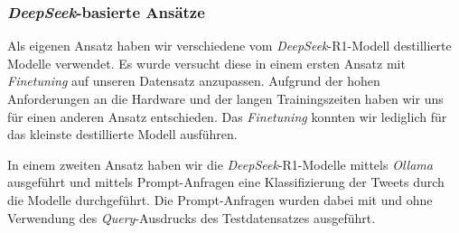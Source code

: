 \subsubsection{\textit{DeepSeek}-basierte Ansätze}\label{subsec:deepseek}

Als eigenen Ansatz haben wir verschiedene vom \textit{DeepSeek}-R1-Modell destillierte Modelle \cite{deepseekai2025deepseekr1incentivizingreasoningcapability} verwendet.
Es wurde versucht diese in einem ersten Ansatz mit \textit{Finetuning} auf unseren Datensatz anzupassen.
Aufgrund der hohen Anforderungen an die Hardware und der langen Trainingszeiten haben wir uns für einen anderen Ansatz entschieden. Das \textit{Finetuning} konnten wir lediglich für das kleinste destillierte Modell ausführen.

In einem zweiten Ansatz haben wir die \textit{DeepSeek}-R1-Modelle mittels \textit{Ollama} \cite{ollama2025meta} ausgeführt und mittels Prompt-Anfragen eine Klassifizierung der Tweets durch die Modelle durchgeführt.
Die Prompt-Anfragen wurden dabei mit und ohne Verwendung des \textit{Query}-Ausdrucks des Testdatensatzes ausgeführt.
